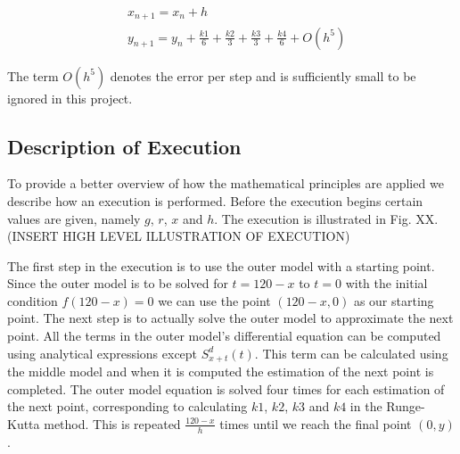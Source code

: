 \begin{align}
\nonumber& x_{n + 1} = x_n + h \\
&y_{n + 1} = y_n + \frac{k1}{6} + \frac{k2}{3} + \frac{k3}{3} + \frac{k4}{6} + O(h^5)
\end{align}

The term $O(h^5)$ denotes the error per step and is sufficiently small to be ignored in this project.

\subsection{Description of Execution}
	To provide a better overview of how the mathematical principles are applied we describe how an execution is performed. Before the execution begins certain values are given, namely $g$, $r$, $x$ and $h$. The execution is illustrated in Fig. XX. \\
	
	(INSERT HIGH LEVEL ILLUSTRATION OF EXECUTION)
	
	
	The first step in the execution is to use the outer model with a starting point. Since the outer model is to be solved for $t=120-x$ to $t=0$ with the initial condition $f(120-x)=0$ we can use the point $(120-x, 0)$ as our starting point. The next step is to actually solve the outer model to approximate the next point. All the terms in the outer model's differential equation can be computed using analytical expressions except $S_{x+t}^d (t)$. This term can be calculated using the middle model and when it is computed the estimation of the next point is completed. The outer model equation is solved four times for each estimation of the next point, corresponding to calculating $k1$, $k2$, $k3$ and $k4$ in the Runge-Kutta method. This is repeated $\frac{120-x}{h}$ times until we reach the final point $(0,y)$. \\
	
